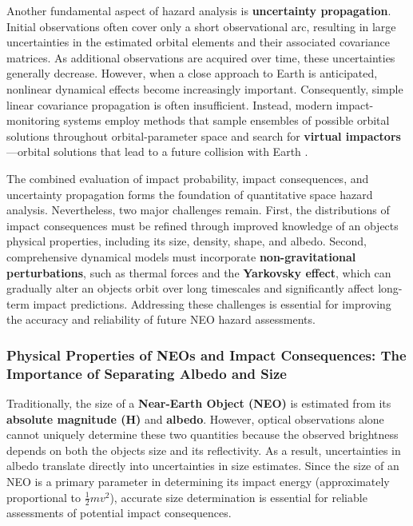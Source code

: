Another fundamental aspect of hazard analysis is \textbf{uncertainty propagation}. Initial observations often cover only a short observational arc, resulting in large uncertainties in the estimated orbital elements and their associated covariance matrices. As additional observations are acquired over time, these uncertainties generally decrease. However, when a close approach to Earth is anticipated, nonlinear dynamical effects become increasingly important. Consequently, simple linear covariance propagation is often insufficient. Instead, modern impact-monitoring systems employ methods that sample ensembles of possible orbital solutions throughout orbital-parameter space and search for \textbf{virtual impactors}---orbital solutions that lead to a future collision with Earth \cite{milani2005}.

The combined evaluation of impact probability, impact consequences, and uncertainty propagation forms the foundation of quantitative space hazard analysis. Nevertheless, two major challenges remain. First, the distributions of impact consequences must be refined through improved knowledge of an object\textquotesingle s physical properties, including its size, density, shape, and albedo. Second, comprehensive dynamical models must incorporate \textbf{non-gravitational perturbations}, such as thermal forces and the \textbf{Yarkovsky effect}, which can gradually alter an object\textquotesingle s orbit over long timescales and significantly affect long-term impact predictions. Addressing these challenges is essential for improving the accuracy and reliability of future NEO hazard assessments.

\subsubsection{Physical Properties of NEOs and Impact Consequences: The Importance of Separating Albedo and Size}

Traditionally, the size of a \textbf{Near-Earth Object (NEO)} is estimated from its \textbf{absolute magnitude (H)} and \textbf{albedo}. However, optical observations alone cannot uniquely determine these two quantities because the observed brightness depends on both the object\textquotesingle s size and its reflectivity. As a result, uncertainties in albedo translate directly into uncertainties in size estimates. Since the size of an NEO is a primary parameter in determining its impact energy (approximately proportional to \textbf{$\frac{1}{2}mv^2$}), accurate size determination is essential for reliable assessments of potential impact consequences.

